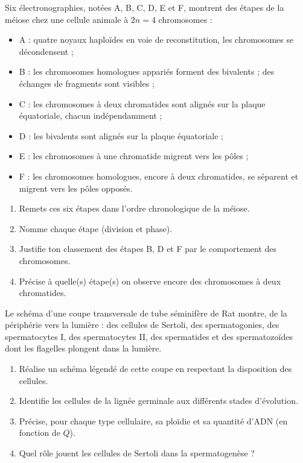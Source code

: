 \documentclass[11pt]{article}
\begin{document}
\begin{exercice}
Six électronographies, notées A, B, C, D, E et F, montrent des étapes de la méiose chez une cellule animale à $2n = 4$ chromosomes :
\begin{itemize}
\item A : quatre noyaux haploïdes en voie de reconstitution, les chromosomes se décondensent ;
\item B : les chromosomes homologues appariés forment des bivalents ; des échanges de fragments sont visibles ;
\item C : les chromosomes à deux chromatides sont alignés sur la plaque équatoriale, chacun indépendamment ;
\item D : les bivalents sont alignés sur la plaque équatoriale ;
\item E : les chromosomes à une chromatide migrent vers les pôles ;
\item F : les chromosomes homologues, encore à deux chromatides, se séparent et migrent vers les pôles opposés.
\end{itemize}
\begin{enumerate}
\item Remets ces six étapes dans l'ordre chronologique de la méiose.
\item Nomme chaque étape (division et phase).
\item Justifie ton classement des étapes B, D et F par le comportement des chromosomes.
\item Précise à quelle(s) étape(s) on observe encore des chromosomes à deux chromatides.
\end{enumerate}
\end{exercice}

\begin{exercice}
Le schéma d'une coupe transversale de tube séminifère de Rat montre, de la périphérie vers la lumière : des cellules de Sertoli, des spermatogonies, des spermatocytes I, des spermatocytes II, des spermatides et des spermatozoïdes dont les flagelles plongent dans la lumière.
\begin{enumerate}
\item Réalise un schéma légendé de cette coupe en respectant la disposition des cellules.
\item Identifie les cellules de la lignée germinale aux différents stades d'évolution.
\item Précise, pour chaque type cellulaire, sa ploïdie et sa quantité d'ADN (en fonction de $Q$).
\item Quel rôle jouent les cellules de Sertoli dans la spermatogenèse ?
\end{enumerate}
\end{exercice}
\end{document}
